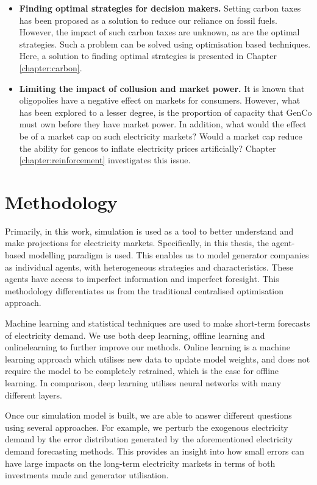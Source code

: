 \begin{itemize}
	\item \textbf{Finding optimal strategies for decision makers.} Setting carbon taxes has been proposed as a solution to reduce our reliance on fossil fuels. However, the impact of such carbon taxes are unknown, as are the optimal strategies. Such a problem can be solved using optimisation based techniques. Here, a solution to finding optimal strategies is presented in Chapter \ref{chapter:carbon}.
	
	\item \textbf{Limiting the impact of collusion and market power.} It is known that oligopolies have a negative effect on markets for consumers. However, what has been explored to a lesser degree, is the proportion of capacity that \gls{GenCo} must own before they have market power. In addition, what would the effect be of a market cap on such electricity markets? Would a market cap reduce the ability for \acrfull{gencos} to inflate electricity prices artificially? Chapter \ref{chapter:reinforcement} investigates this issue.
	
\end{itemize}

\section{Methodology}

Primarily, in this work, simulation is used as a tool to better understand and make projections for electricity markets. Specifically, in this thesis, the agent-based modelling paradigm is used. This enables us to model generator companies as individual agents, with heterogeneous strategies and characteristics. These agents have access to imperfect information and imperfect foresight. This methodology differentiates us from the traditional centralised optimisation approach.

Machine learning and statistical techniques are used to make short-term forecasts of electricity demand. We use both deep learning, offline learning and \gls{onlinelearning} to further improve our methods. Online learning is a machine learning approach which utilises new data to update model weights, and does not require the model to be completely retrained, which is the case for offline learning. In comparison, deep learning utilises neural networks with many different layers. 

Once our simulation model is built, we are able to answer different questions using several approaches. For example, we perturb the exogenous electricity demand by the error distribution generated by the aforementioned electricity demand forecasting methods. This provides an insight into how small errors can have large impacts on the long-term electricity markets in terms of both investments made and generator utilisation.

